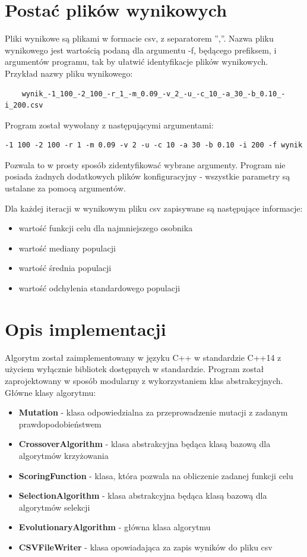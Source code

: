 \documentclass[12pt]{article}
\makeatletter
\newcommand{\verbatimfont}[1]{\renewcommand{\verbatim@font}{\ttfamily#1}}
\makeatother
\begin{document}
\section{Postać plików wynikowych}
Pliki wynikowe są plikami w formacie csv, z separatorem '',''. Nazwa pliku wynikowego jest wartością podaną dla argumentu -f, będącego prefiksem, i argumentów programu, tak by ułatwić identyfikacje plików wynikowych. \\

Przykład nazwy pliku wynikowego: 
\verbatimfont{\footnotesize}
\begin{verbatim}
	wynik_-1_100_-2_100_-r_1_-m_0.09_-v_2_-u_-c_10_-a_30_-b_0.10_-i_200.csv
\end{verbatim}

Program został wywołany z następującymi argumentami:
\verbatimfont{\footnotesize}
\begin{verbatim}
-1 100 -2 100 -r 1 -m 0.09 -v 2 -u -c 10 -a 30 -b 0.10 -i 200 -f wynik
\end{verbatim}

Pozwala to w prosty sposób zidentyfikować wybrane argumenty. Program nie posiada żadnych dodatkowych plików konfiguracyjny - wszystkie parametry są ustalane za pomocą argumentów. 

\bigskip

Dla każdej iteracji w wynikowym pliku csv zapisywane są następujące informacje:
\begin{itemize}
	\item{wartość funkcji celu dla najmniejszego osobnika}
	\item{wartość mediany populacji}
	\item{wartość średnia populacji}
	\item{wartość odchylenia standardowego populacji}
\end{itemize}

\newpage

\section{Opis implementacji}
Algorytm został zaimplementowany w języku C++ w standardzie C++14 z użyciem wyłącznie bibliotek dostępnych w standardzie. Program został zaprojektowany w sposób modularny z wykorzystaniem klas abstrakcyjnych. Główne klasy algorytmu:

\begin{itemize}
	\item{\textbf{Mutation} - klasa odpowiedzialna za przeprowadzenie mutacji z zadanym prawdopodobieństwem}
	\item{\textbf{CrossoverAlgorithm} - klasa abstrakcyjna będąca klasą bazową dla algorytmów krzyżowania}
	\item{\textbf{ScoringFunction} - klasa, która pozwala na obliczenie zadanej funkcji celu}
	\item{\textbf{SelectionAlgorithm} - klasa abstrakcyjna będąca klasą bazową dla algorytmów selekcji}
	\item{\textbf{EvolutionaryAlgorithm} - główna klasa algorytmu}
	\item{\textbf{CSVFileWriter} - klasa opowiadająca za zapis wyników do pliku csv} 
\end{itemize}
\end{document}
